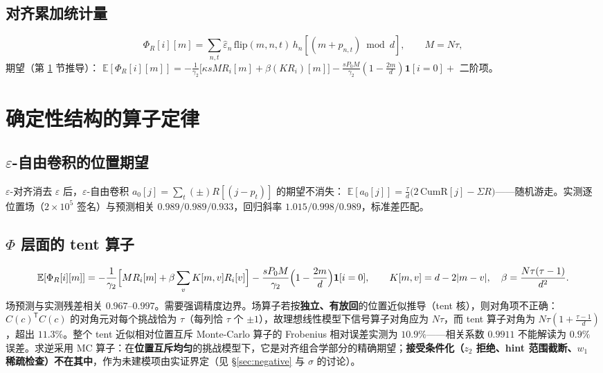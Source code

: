 \documentclass[11pt,a4paper]{ctexart}
\begin{document}
\subsection{对齐累加统计量}

\begin{equation}
\Phi_R[i][m] = \sum_{n,t} \hat\varepsilon_n\,\mathrm{flip}(m,n,t)\,h_n[(m+p_{n,t}) \bmod d],
\qquad M = N\tau,
\end{equation}
期望（第 \ref{sec:field} 节推导）：
$\mathbb{E}[\Phi_R[i][m]] = -\frac{1}{\gamma_2}\bigl[\kappa s M R_i[m] + \beta(KR_i)[m]\bigr] - \frac{sP_0M}{\gamma_2}(1-\tfrac{2m}{d})\mathbf{1}[i=0] + $ 二阶项。

\section{确定性结构的算子定律}\label{sec:field}

\subsection{$\varepsilon$-自由卷积的位置期望}

$\varepsilon$-对齐消去 $\varepsilon$ 后，$\varepsilon$-自由卷积 $a_0[j] = \sum_t(\pm)R[(j-p_t)]$ 的期望不消失：
$\mathbb{E}[a_0[j]] = \frac{\tau}{d}\bigl(2\,\mathrm{CumR}[j] - \Sigma R\bigr)$——随机游走。实测逐位置场（$2\times10^5$ 签名）与预测相关 $0.989/0.989/0.933$，回归斜率 $1.015/0.998/0.989$，标准差匹配。

\subsection{$\Phi$ 层面的 tent 算子}

\begin{equation}
\mathbb{E}[\Phi_R[i][m]] = -\frac{1}{\gamma_2}\Bigl[M R_i[m] + \beta\sum_v K[m,v]R_i[v]\Bigr] - \frac{sP_0M}{\gamma_2}\Bigl(1-\frac{2m}{d}\Bigr)\mathbf{1}[i=0],
\qquad K[m,v] = d - 2|m-v|,\quad \beta = \frac{N\tau(\tau-1)}{d^2}.
\end{equation}
场预测与实测残差相关 $0.967$--$0.997$。需要强调精度边界。场算子若按\textbf{独立、有放回}的位置近似推导（tent 核），则对角项不正确：$C(c)^{\mathsf T}C(c)$ 的对角元对每个挑战恰为 $\tau$（每列恰 $\tau$ 个 $\pm1$），故理想线性模型下信号算子对角应为 $N\tau$，而 tent 算子对角为 $N\tau(1+\frac{\tau-1}{d})$，超出 $11.3\%$。整个 tent 近似相对位置互斥 Monte-Carlo 算子的 Frobenius 相对误差实测为 $10.9\%$——相关系数 $0.9911$ 不能解读为 $0.9\%$ 误差。求逆采用 MC 算子：在\textbf{位置互斥均匀}的挑战模型下，它是对齐组合学部分的精确期望；\textbf{接受条件化（$z_2$ 拒绝、hint 范围截断、$w_1$ 稀疏检查）不在其中}，作为未建模项由实证界定（见 \S\ref{sec:negative} 与 $\sigma$ 的讨论）。
\end{document}
